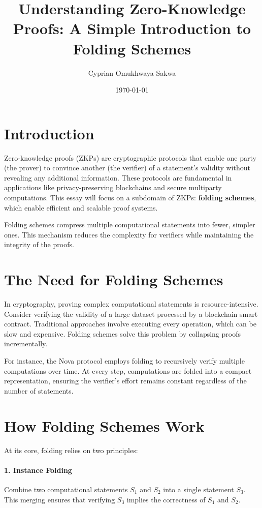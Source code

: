 \documentclass[12pt]{article}
\title{Understanding Zero-Knowledge Proofs: A Simple Introduction to Folding Schemes}
\author{Cyprian Omukhwaya Sakwa}
\date{\today}
\begin{document}
	
	\maketitle
	
	\section*{Introduction}
	
	Zero-knowledge proofs (ZKPs) are cryptographic protocols that enable one party (the prover) to convince another (the verifier) of a statement's validity without revealing any additional information. These protocols are fundamental in applications like privacy-preserving blockchains and secure multiparty computations. This essay will focus on a subdomain of ZKPs: \textbf{folding schemes}, which enable efficient and scalable proof systems.
	
	Folding schemes compress multiple computational statements into fewer, simpler ones. This mechanism reduces the complexity for verifiers while maintaining the integrity of the proofs. 
	
	\section*{The Need for Folding Schemes}
	
	In cryptography, proving complex computational statements is resource-intensive. Consider verifying the validity of a large dataset processed by a blockchain smart contract. Traditional approaches involve executing every operation, which can be slow and expensive. Folding schemes solve this problem by collapsing proofs incrementally.
	
	For instance, the Nova protocol employs folding to recursively verify multiple computations over time. At every step, computations are folded into a compact representation, ensuring the verifier’s effort remains constant regardless of the number of statements.
	
	\section*{How Folding Schemes Work}
	
	At its core, folding relies on two principles:
	
	\paragraph*{1. Instance Folding}
	Combine two computational statements \( S_1 \) and \( S_2 \) into a single statement \( S_3 \). This merging ensures that verifying \( S_3 \) implies the correctness of \( S_1 \) and \( S_2 \).
	
\end{document}
